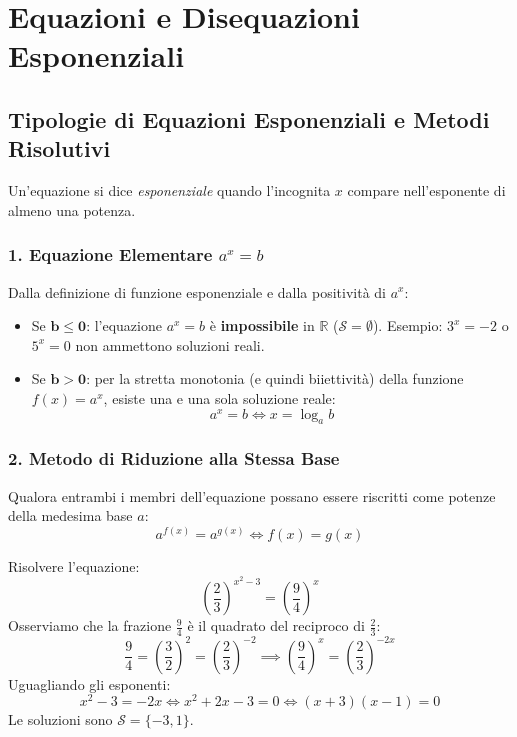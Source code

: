 \documentclass[11pt,a4paper,oneside]{report}
\begin{document}
\chapter{Equazioni e Disequazioni Esponenziali}

\section{Tipologie di Equazioni Esponenziali e Metodi Risolutivi}
Un'equazione si dice \emph{esponenziale} quando l'incognita $x$ compare nell'esponente di almeno una potenza.

\subsection{1. Equazione Elementare \texorpdfstring{$a^x = b$}{a\^{}x = b}}
Dalla definizione di funzione esponenziale e dalla positività di $a^x$:
\begin{itemize}
    \item Se $\mathbf{b \le 0}$: l'equazione $a^x = b$ è \textbf{impossibile} in $\mathbb{R}$ ($\mathcal{S} = \emptyset$). Esempio: $3^x = -2$ o $5^x = 0$ non ammettono soluzioni reali.
    \item Se $\mathbf{b > 0}$: per la stretta monotonia (e quindi biiettività) della funzione $f(x) = a^x$, esiste una e una sola soluzione reale:
    \begin{equation}
        a^x = b \iff x = \log_a b
    \end{equation}
\end{itemize}

\subsection{2. Metodo di Riduzione alla Stessa Base}
Qualora entrambi i membri dell'equazione possano essere riscritti come potenze della medesima base $a$:
\begin{equation}
    a^{f(x)} = a^{g(x)} \iff f(x) = g(x)
\end{equation}

\begin{esempio}
Risolvere l'equazione:
\begin{equation*}
    \left(\frac{2}{3}\right)^{x^2 - 3} = \left(\frac{9}{4}\right)^{x}
\end{equation*}
Osserviamo che la frazione $\frac{9}{4}$ è il quadrato del reciproco di $\frac{2}{3}$:
\begin{equation*}
    \frac{9}{4} = \left(\frac{3}{2}\right)^2 = \left(\frac{2}{3}\right)^{-2} \implies \left(\frac{9}{4}\right)^x = \left(\frac{2}{3}\right)^{-2x}
\end{equation*}
Uguagliando gli esponenti:
\begin{equation*}
    x^2 - 3 = -2x \iff x^2 + 2x - 3 = 0 \iff (x + 3)(x - 1) = 0
\end{equation*}
Le soluzioni sono $\mathcal{S} = \{-3, 1\}$.
\end{esempio}
\end{document}
